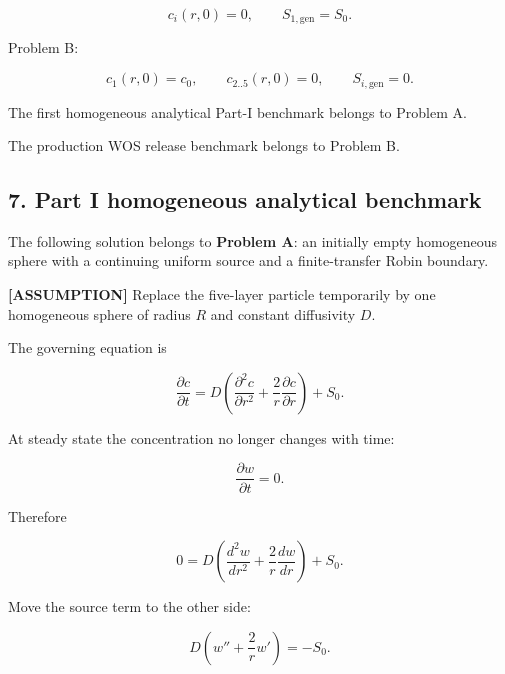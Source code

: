 \documentclass[11pt,a4paper]{article}
\begin{document}
\begin{equation}
c_i(r,0)=0,
\qquad
S_{1,\mathrm{gen}}=S_0.
\tag{TRISO-IC-105}
\label{eq:triso-ic-105}
\end{equation}

Problem B:

\begin{equation}
c_1(r,0)=c_0,
\qquad
c_{2..5}(r,0)=0,
\qquad
S_{i,\mathrm{gen}}=0.
\tag{TRISO-IC-106}
\label{eq:triso-ic-106}
\end{equation}

The first homogeneous analytical Part-I benchmark belongs to Problem A.

The production WOS release benchmark belongs to Problem B.

\subsection*{7. Part I homogeneous analytical benchmark}

The following solution belongs to \textbf{Problem A}: an initially empty homogeneous sphere with a continuing uniform source and a finite-transfer Robin boundary.

\textbf{[ASSUMPTION]} Replace the five-layer particle temporarily by one homogeneous sphere of radius $R$ and constant diffusivity $D$.

The governing equation is

\begin{equation}
\frac{\partial c}{\partial t}
=
D
\left(
\frac{\partial^2c}{\partial r^2}
+
\frac2r
\frac{\partial c}{\partial r}
\right)
+
S_0.
\tag{TRISO-ANA-100}
\label{eq:triso-ana-100}
\end{equation}

At steady state the concentration no longer changes with time:

\begin{equation}
\frac{\partial w}{\partial t}=0.
\tag{TRISO-ANA-101}
\label{eq:triso-ana-101}
\end{equation}

Therefore

\begin{equation}
0
=
D
\left(
\frac{d^2w}{dr^2}
+
\frac2r\frac{dw}{dr}
\right)
+
S_0.
\tag{TRISO-ANA-102}
\label{eq:triso-ana-102}
\end{equation}

Move the source term to the other side:

\begin{equation}
D
\left(
w''
+
\frac2r w'
\right)
=
-S_0.
\tag{TRISO-ANA-103}
\label{eq:triso-ana-103}
\end{equation}
\end{document}
